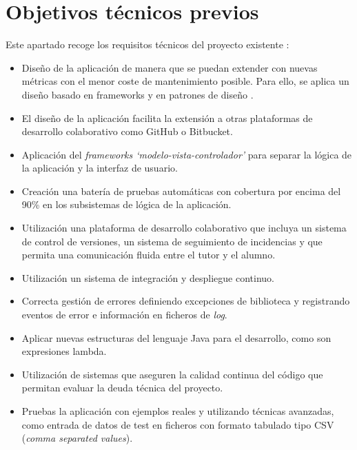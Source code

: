 \section{Objetivos técnicos previos}
Este apartado recoge los requisitos técnicos del proyecto existente  \cite{TFGPrevio}:
\begin{itemize}
	\tightlist
	\item Diseño de la aplicación de manera que se puedan extender con nuevas métricas con el menor coste de mantenimiento posible. Para ello, se aplica un diseño basado en frameworks y en patrones de diseño \cite{gamma_patrones_2002}.
	\item El diseño de la aplicación facilita la extensión a otras plataformas de desarrollo colaborativo como GitHub o Bitbucket.
	\item Aplicación del \textit{frameworks `modelo-vista-controlador'} para separar la lógica de la aplicación y la interfaz de usuario.
	\item Creación una batería de pruebas automáticas con cobertura por encima del 90\% en los subsistemas de lógica de la aplicación.
	\item Utilización una plataforma de desarrollo colaborativo que incluya un sistema de control de versiones, un sistema de seguimiento de incidencias y que permita una comunicación fluida entre el tutor y el alumno.
	\item Utilización un sistema de integración y despliegue continuo.
	\item Correcta gestión de errores definiendo excepciones de biblioteca y registrando eventos de error e información en ficheros de \textit{log}. 
	\item Aplicar nuevas estructuras  del lenguaje Java para el desarrollo, como son expresiones lambda. 
	\item Utilización de sistemas que aseguren la calidad continua del código que permitan evaluar la deuda técnica del proyecto.
	\item Pruebas la aplicación con ejemplos reales y utilizando técnicas avanzadas, como entrada de datos de test en ficheros con formato tabulado tipo CSV (\textit{comma separated values}). 	
\end{itemize}

